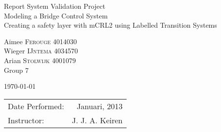 \documentclass{article}
\begin{document}
\centering
\vspace{+150pt}
\LARGE{Report System Validation Project \\
  Modeling a Bridge Control System\\
  Creating a safety layer with mCRL2 using Labelled Transition Systems} %
\vspace{+50pt} %

\Large{Aimee \textsc{Ferouge} 4014030 \\
  Wieger \textsc{IJntema} 4034570 \\
  Arian \textsc{Stolwijk} 4001079 \\
  Group 7} %

\vspace{+50pt} %
\today %
\vspace{+300pt} %

\vfill
\begin{center}
\begin{tabular}{l r}
Date Performed: & Januari, 2013 \\ %
Instructor: & J. J. A. Keiren %
\end{tabular}
\end{center}

\raggedright
\normalsize



\setcounter{page}{0}


\listoffigures
{}
\listoftables

\newpage
\tableofcontents
\newpage
\pagestyle{plain}
\setcounter{page}{1}
\setcounter{section}{0}

%

%








\end{document}
